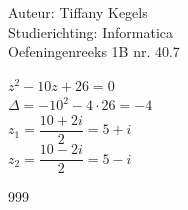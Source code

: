 \documentclass[a4paper]{article}
\begin{document}
  
\noindent \large Auteur: Tiffany Kegels \\
\noindent \large Studierichting: Informatica\\
\noindent \large Oefeningenreeks 1B nr. 40.7\\

\medskip

\normalsize

$z^2 - 10z +26 = 0$\\

$\Delta = -10^2 -4\cdot 26 = -4$\\

$z_1 = \dfrac{10+2i}{2} = 5+i$\\

$z_2 = \dfrac{10-2i}{2} = 5-i$\\


\begin{thebibliography}{999}

\end{thebibliography}
\end{document}
